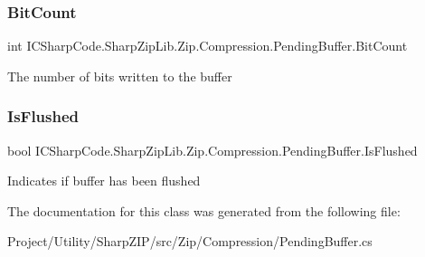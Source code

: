 \subsubsection{\texorpdfstring{Bit\+Count}{BitCount}}
{\footnotesize\ttfamily int I\+C\+Sharp\+Code.\+Sharp\+Zip\+Lib.\+Zip.\+Compression.\+Pending\+Buffer.\+Bit\+Count\hspace{0.3cm}{\ttfamily [get]}}



The number of bits written to the buffer 

\mbox{\label{class_i_c_sharp_code_1_1_sharp_zip_lib_1_1_zip_1_1_compression_1_1_pending_buffer_ad89d7e99140fb1b5178f9a1ab0562a26}} 
\subsubsection{\texorpdfstring{Is\+Flushed}{IsFlushed}}
{\footnotesize\ttfamily bool I\+C\+Sharp\+Code.\+Sharp\+Zip\+Lib.\+Zip.\+Compression.\+Pending\+Buffer.\+Is\+Flushed\hspace{0.3cm}{\ttfamily [get]}}



Indicates if buffer has been flushed 



The documentation for this class was generated from the following file\+:\begin{DoxyCompactItemize}
\item 
Project/\+Utility/\+Sharp\+Z\+I\+P/src/\+Zip/\+Compression/Pending\+Buffer.\+cs\end{DoxyCompactItemize}
